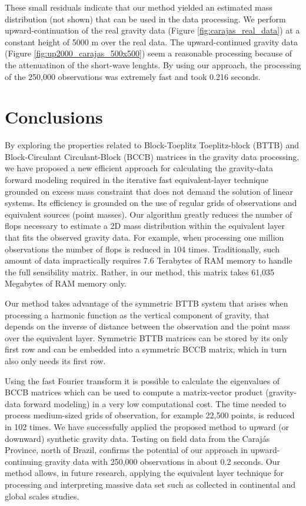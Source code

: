 \documentclass[paper]{geophysics}
\begin{document}
These small residuals indicate that our method yielded an estimated mass distribution (not shown) that can be used in the data processing. We perform upward-continuation of the real gravity data (Figure \ref{fig:carajas_real_data}) at a constant height of 5000 m over the real data. The upward-continued gravity data (Figure \ref{fig:up2000_carajas_500x500}) seem a reasonable processing because of the attenuatinon of the short-wave lenghts. By using our approach, the processing of the 250,000 observations was extremely fast and took 0.216 seconds.


\section{Conclusions}
By exploring the properties related to Block-Toeplitz Toeplitz-block (BTTB) and Block-Circulant Circulant-Block (BCCB) matrices in the gravity data processing, we have proposed a new efficient approach for calculating the gravity-data forward modeling required in the iterative fast equivalent-layer technique grounded on excess mass constraint that does not demand  the solution of linear systems.  Its efficiency is grounded on the use of regular grids of observations and equivalent sources (point masses). Our algorithm greatly reduces the number of  flops necessary to estimate a 2D mass distribution within the equivalent layer that fits the observed gravity data. For example, when processing one million observations the number of flops is reduced in 104 times. Traditionally, such amount of data impractically requires 7.6 Terabytes of RAM memory to handle the full sensibility matrix. Rather, in our method, this matrix takes 61,035 Megabytes of RAM memory only.

Our method takes advantage of the symmetric BTTB system that arises when processing a harmonic function as the vertical component of gravity, that depends on the inverse
of distance between the observation and the point mass over the equivalent layer. Symmetric BTTB matrices can be stored by its only first row and can be embedded into a symmetric BCCB matrix, which in turn also only needs its first row.

Using the fast Fourier transform it is possible to calculate the eigenvalues of BCCB matrices which can
be used to compute a matrix-vector product (gravity-data forward modeling) in a very low computational cost. The time
needed to process medium-sized grids of observation, for example 22,500 points, is reduced in 102 times. We have successfully applied the proposed method to upward (or downward) synthetic gravity data. Testing on field data from the Caraj\'as Province, north of Brazil, confirms the potential of our approach in upward-continuing  gravity data with 250,000 observations in  about 0.2 seconds.  Our method allows, in future research, applying the equivalent layer technique for processing and interpreting massive data set such as collected in continental and global scales studies.
\end{document}
